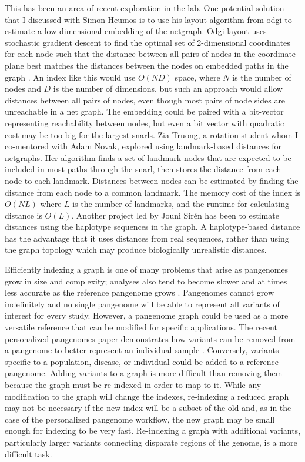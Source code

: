 \documentclass[11pt]{ucscthesis}
\begin{document}
This has been an area of recent exploration in the lab.
One potential solution that I discussed with Simon Heumos is to use his layout algorithm from odgi to estimate a low-dimensional embedding of the netgraph.
Odgi layout uses stochastic gradient descent to find the optimal set of 2-dimensional coordinates for each node such that the distance between all pairs of nodes in the coordinate plane best matches the distances between the nodes on embedded paths in the graph \cite{guarracino_odgi_2022}.
An index like this would use $O(ND)$ space, where $N$ is the number of nodes and $D$ is the number of dimensions, but such an approach would allow distances between all pairs of nodes, even though most pairs of node sides are unreachable in a net graph.
The embedding could be paired with a bit-vector representing reachability between nodes, but even a bit vector with quadratic cost may be too big for the largest snarls. 
Zia Truong, a rotation student whom I co-mentored with Adam Novak, explored using landmark-based distances for netgraphs.
Her algorithm finds a set of landmark nodes that are expected to be included in most paths through the snarl, then stores the distance from each node to each landmark.
Distances between nodes can be estimated by finding the distance from each node to a common landmark.
The memory cost of the index is $O(NL)$ where $L$ is the number of landmarks, and the runtime for calculating distance is $O(L)$.
Another project led by Jouni Sirén has been to estimate distances using the haplotype sequences in the graph.
A haplotype-based distance has the advantage that it uses distances from real sequences, rather than using the graph topology which may produce biologically unrealistic distances.

Efficiently indexing a graph is one of many problems that arise as pangenomes grow in size and complexity; analyses also tend to become slower and at times less accurate as the reference pangenome grows \cite{Pritt2018}.
Pangenomes cannot grow indefinitely and no single pangenome will be able to represent all variants of interest for every study.
However, a pangenome graph could be used as a more versatile reference that can be modified for specific applications.
The recent personalized pangenomes paper demonstrates how variants can be removed from a pangenome to better represent an individual sample \cite{siren_personalized_2024}. 
Conversely, variants specific to a population, disease, or individual could be added to a reference pangenome.
Adding variants to a graph is more difficult than removing them because the graph must be re-indexed in order to map to it.
While any modification to the graph will change the indexes, re-indexing a reduced graph may not be necessary if the new index will be a subset of the old and, as in the case of the personalized pangenome workflow, the new graph may be small enough for indexing to be very fast.
Re-indexing a graph with additional variants, particularly larger variants connecting disparate regions of the genome, is a more difficult task. 
\end{document}
